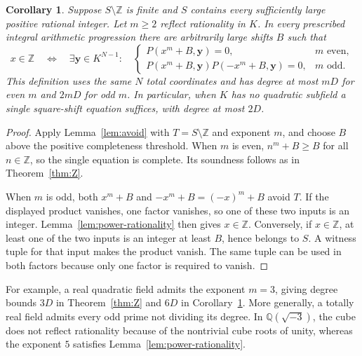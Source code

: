 \documentclass[11pt,a4paper]{article}
\newtheorem{corollary}[theorem]{Corollary}
\newcommand{\Q}{\mathbb Q}\newcommand{\Z}{\mathbb Z}
\begin{document}
\begin{corollary}\label{cor:positive-Z}
Suppose $S\setminus\Z$ is finite and $S$ contains every
sufficiently large positive rational integer. Let $m\ge2$
reflect rationality in $K$. In every prescribed integral arithmetic
progression there are arbitrarily large shifts $B$ such that
\[
 x\in\Z\quad\Longleftrightarrow\quad
 \exists\mathbf y\in K^{N-1}:\quad
 \begin{cases}
 P(x^m+B,\mathbf y)=0,&m\text{ even},\\
 P(x^m+B,\mathbf y)P(-x^m+B,\mathbf y)=0,&m\text{ odd}.
 \end{cases}
\]
This definition uses the same $N$ total coordinates and has
degree at most $mD$ for even $m$ and $2mD$ for odd $m$.
In particular, when $K$ has no quadratic subfield a single
square-shift equation suffices, with degree at most $2D$.
\end{corollary}
\begin{proof}
Apply Lemma~\ref{lem:avoid} with $T=S\setminus\Z$ and
exponent $m$, and choose $B$ above the positive completeness
threshold. When $m$ is even, $n^m+B\ge B$ for all $n\in\Z$,
so the single equation is complete. Its soundness follows as in
Theorem~\ref{thm:Z}.

When $m$ is odd, both $x^m+B$ and $-x^m+B=(-x)^m+B$ avoid $T$.
If the displayed product vanishes, one factor vanishes, so one
of these two inputs is an integer. Lemma~\ref{lem:power-rationality}
then gives $x\in\Z$. Conversely, if $x\in\Z$, at least one
of the two inputs is an integer at least $B$, hence belongs to
$S$. A witness tuple for that input makes the product vanish.
The same tuple can be used in both factors because only one
factor is required to vanish.
\end{proof}

For example, a real quadratic field admits the exponent $m=3$,
giving degree bounds $3D$ in Theorem~\ref{thm:Z} and $6D$ in
Corollary~\ref{cor:positive-Z}. More generally, a totally real
field admits every odd prime not dividing its degree. In
$\Q(\sqrt{-3})$, the cube does not reflect rationality because
of the nontrivial cube roots of unity, whereas the exponent $5$
satisfies Lemma~\ref{lem:power-rationality}.
\end{document}
